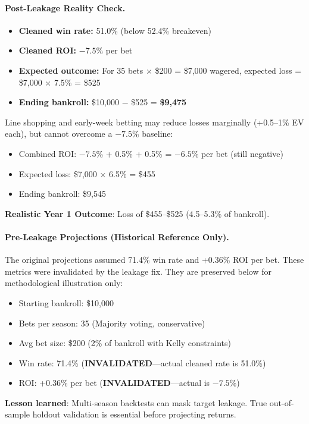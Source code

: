 \paragraph{Post-Leakage Reality Check.}
\begin{itemize}
\item \textbf{Cleaned win rate:} 51.0\% (below 52.4\% breakeven)
\item \textbf{Cleaned ROI:} $-7.5$\% per bet
\item \textbf{Expected outcome:} For 35 bets × \$200 = \$7,000 wagered, expected loss = \$7,000 × 7.5\% = \$525
\item \textbf{Ending bankroll:} \$10,000 $-$ \$525 = \textbf{\$9,475}
\end{itemize}

Line shopping and early-week betting may reduce losses marginally (+0.5--1\% EV each), but cannot overcome a $-7.5$\% baseline:
\begin{itemize}
\item Combined ROI: $-7.5$\% + 0.5\% + 0.5\% = $-6.5$\% per bet (still negative)
\item Expected loss: \$7,000 × 6.5\% = \$455
\item Ending bankroll: \$9,545
\end{itemize}

\textbf{Realistic Year 1 Outcome}: Loss of \$455--\$525 (4.5--5.3\% of bankroll).

\paragraph{Pre-Leakage Projections (Historical Reference Only).}
The original projections assumed 71.4\% win rate and +0.36\% ROI per bet. These metrics were invalidated by the leakage fix. They are preserved below for methodological illustration only:

\begin{itemize}
\item Starting bankroll: \$10,000
\item Bets per season: 35 (Majority voting, conservative)
\item Avg bet size: \$200 (2\% of bankroll with Kelly constraints)
\item Win rate: 71.4\% (\textbf{INVALIDATED}---actual cleaned rate is 51.0\%)
\item ROI: +0.36\% per bet (\textbf{INVALIDATED}---actual is $-7.5$\%)
\end{itemize}

\textbf{Lesson learned}: Multi-season backtests can mask target leakage. True out-of-sample holdout validation is essential before projecting returns.


